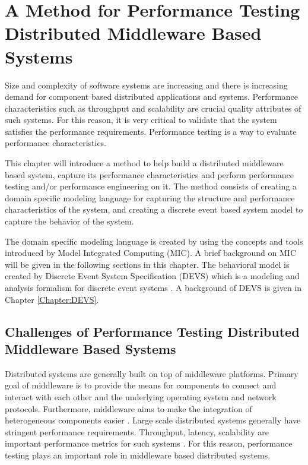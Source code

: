 \chapter{A Method for Performance Testing Distributed Middleware Based Systems}
\label{Chapter:Methodology}

Size and complexity of software systems are increasing and there is increasing demand for component based distributed applications and systems. Performance characteristics such as throughput and scalability are crucial quality attributes of such systems. For this reason, it is very critical to validate that the system satisfies the performance requirements. Performance testing is a way to evaluate performance characteristics. 

This chapter will introduce a method to help build a distributed middleware based system, capture its performance characteristics and perform performance testing and/or performance engineering on it. The method consists of creating a domain specific modeling language for capturing the structure and performance characteristics of the system, and creating a discrete event based system model to capture the behavior of the system. 

The domain specific modeling language is created by using the concepts and tools introduced by Model Integrated Computing (MIC). A brief background on MIC will be given in the following sections in this chapter. The behavioral model is created by Discrete Event System Specification (DEVS) which is a modeling and analysis formalism for discrete event systems \cite{Zeigler84}. A background of DEVS is given in Chapter \ref{Chapter:DEVS}. 


\section{Challenges of Performance Testing Distributed Middleware Based Systems}

Distributed systems are generally built on top of middleware platforms. Primary goal of middleware is to provide the means for components to connect and interact with each other and the underlying operating system and network protocols. Furthermore, middleware aims to make the integration of heterogeneous components easier \cite{SS01}. Large scale distributed systems generally have stringent performance requirements. Throughput, latency, scalability are important performance metrics for such systems \cite{Weyuker00, Gao03}. For this reason, performance testing plays an important role in middleware based distributed systems. 

